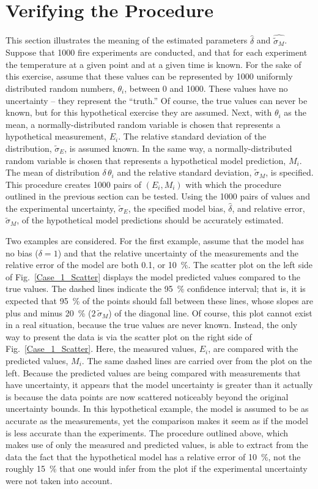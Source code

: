 \section{Verifying the Procedure}

This section illustrates the meaning of the estimated parameters $\hat{\delta}$ and $\widehat{\widetilde{\sigma}_M}$.
Suppose that 1000 fire experiments are conducted, and that for each experiment the
temperature at a given point and at a given time is known. For the sake of this exercise, assume that these values can be represented by 1000 uniformly distributed
random numbers, $\theta_i$, between 0 and 1000. These values have no uncertainty -- they represent the ``truth.''
Of course, the true values can never be known, but for this hypothetical exercise they are assumed.
Next, with $\theta_i$ as the mean, a normally-distributed random variable is chosen that represents a hypothetical measurement, $E_i$.
The relative standard deviation of the distribution, $\widetilde{\sigma}_E$, is assumed known. In the same way, a normally-distributed
random variable is chosen that represents a hypothetical
model prediction, $M_i$. The mean of distribution $\delta \, \theta_i$ and the relative standard deviation, $\widetilde{\sigma}_M$,
is specified.
This procedure creates 1000 pairs of $(E_i,M_i)$ with which the procedure outlined in the previous section can be tested.
Using the 1000 pairs of values and the experimental uncertainty, $\widetilde{\sigma}_E$, the specified model bias, $\hat{\delta}$,
and relative error, $\widetilde{\sigma}_M$, of the hypothetical model predictions should be accurately estimated.

Two examples are considered. For the first example, assume that the model has no bias ($\delta=1$) and that the relative uncertainty of the measurements and the
relative error of the model are both 0.1, or 10~\%. The scatter plot on the left side of Fig.~\ref{Case_1_Scatter} displays the model predicted values compared to the
true values. The dashed lines indicate the 95~\% confidence interval; that is, it is expected that 95~\% of the points should fall between these
lines, whose slopes are plus and minus 20~\% ($2\, \widetilde{\sigma}_M$) of the diagonal line. Of course, this plot cannot exist in a real situation, because the true
values are never known. Instead, the only way to present the data is via the scatter plot on the right side of Fig.~\ref{Case_1_Scatter}. Here, the measured values, $E_i$, are
compared with the predicted values, $M_i$. The same dashed lines are carried over from the plot on the left. Because the predicted values are being compared
with measurements that have uncertainty, it appears that the model uncertainty is greater than it actually is because the data points are now scattered noticeably beyond the
original uncertainty bounds. In this hypothetical example, the model is
assumed to be as accurate as the measurements, yet the comparison makes it seem as if the model is less accurate than the experiments. The procedure outlined
above, which makes use of only the measured and predicted values, is able to extract from the data the fact that the hypothetical model has a
relative error of 10~\%, not the roughly 15~\% that one would infer from the plot if the experimental uncertainty were not taken into account.

